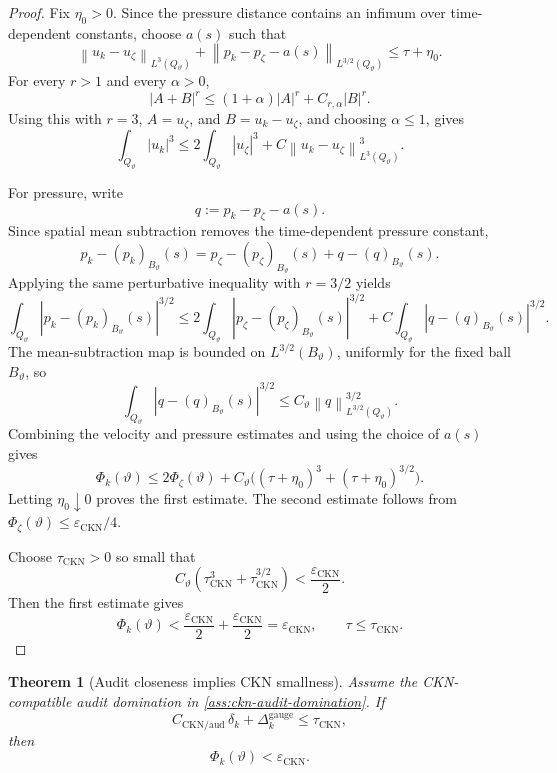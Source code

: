 \documentclass[11pt]{article}
\numberwithin{equation}{section}
\theoremstyle{plain}
\newtheorem{theorem}{Theorem}[section]
\theoremstyle{definition}
\theoremstyle{remark}
\newcommand{\norm}[1]{\left\lVert #1\right\rVert}
\begin{document}
\begin{proof}
Fix \(\eta_0>0\).  Since the pressure distance contains an infimum over
time-dependent constants, choose \(a(s)\) such that
\[
  \norm{u_k-u_\zeta}_{L^3(Q_\vartheta)}
  +
  \norm{p_k-p_\zeta-a(s)}_{L^{3/2}(Q_\vartheta)}
  \le
  \tau+\eta_0.
\]
For every \(r>1\) and every \(\alpha>0\),
\[
  |A+B|^r\le (1+\alpha)|A|^r+C_{r,\alpha}|B|^r .
\]
Using this with \(r=3\), \(A=u_\zeta\), and
\(B=u_k-u_\zeta\), and choosing \(\alpha\le1\), gives
\[
  \int_{Q_\vartheta}|u_k|^3
  \le
  2\int_{Q_\vartheta}|u_\zeta|^3
  +
  C\norm{u_k-u_\zeta}_{L^3(Q_\vartheta)}^3.
\]

For pressure, write
\[
  q:=p_k-p_\zeta-a(s).
\]
Since spatial mean subtraction removes the time-dependent pressure constant,
\[
  p_k-(p_k)_{B_\vartheta}(s)
  =
  p_\zeta-(p_\zeta)_{B_\vartheta}(s)
  +
  q-(q)_{B_\vartheta}(s).
\]
Applying the same perturbative inequality with \(r=3/2\) yields
\[
  \int_{Q_\vartheta}|p_k-(p_k)_{B_\vartheta}(s)|^{3/2}
  \le
  2\int_{Q_\vartheta}
  |p_\zeta-(p_\zeta)_{B_\vartheta}(s)|^{3/2}
  +
  C\int_{Q_\vartheta}|q-(q)_{B_\vartheta}(s)|^{3/2}.
\]
The mean-subtraction map is bounded on \(L^{3/2}(B_\vartheta)\), uniformly for
the fixed ball \(B_\vartheta\), so
\[
  \int_{Q_\vartheta}|q-(q)_{B_\vartheta}(s)|^{3/2}
  \le
  C_\vartheta\norm{q}_{L^{3/2}(Q_\vartheta)}^{3/2}.
\]
Combining the velocity and pressure estimates and using the choice of
\(a(s)\) gives
\[
  \Phi_k(\vartheta)
  \le
  2\Phi_\zeta(\vartheta)
  +
  C_\vartheta\bigl((\tau+\eta_0)^3+(\tau+\eta_0)^{3/2}\bigr).
\]
Letting \(\eta_0\downarrow0\) proves the first estimate.  The second estimate
follows from \(\Phi_\zeta(\vartheta)\le\varepsilon_{\mathrm{CKN}}/4\).

Choose \(\tau_{\mathrm{CKN}}>0\) so small that
\[
  C_\vartheta
  \left(
  \tau_{\mathrm{CKN}}^3+\tau_{\mathrm{CKN}}^{3/2}
  \right)
  <
  \frac{\varepsilon_{\mathrm{CKN}}}{2}.
\]
Then the first estimate gives
\[
  \Phi_k(\vartheta)
  <
  \frac{\varepsilon_{\mathrm{CKN}}}{2}
  +
  \frac{\varepsilon_{\mathrm{CKN}}}{2}
  =
  \varepsilon_{\mathrm{CKN}},
  \qquad
  \tau\le\tau_{\mathrm{CKN}}.
\]
\end{proof}

\begin{theorem}[Audit closeness implies CKN smallness]
\label{thm:audit-closeness-ckn}
Assume the CKN-compatible audit domination in
\cref{ass:ckn-audit-domination}.  If
\[
  C_{\mathrm{CKN/aud}}\,\delta_k+\Delta_k^{\mathrm{gauge}}
  \le
  \tau_{\mathrm{CKN}},
\]
then
\[
  \Phi_k(\vartheta)<\varepsilon_{\mathrm{CKN}}.
\]
\end{theorem}
\end{document}
